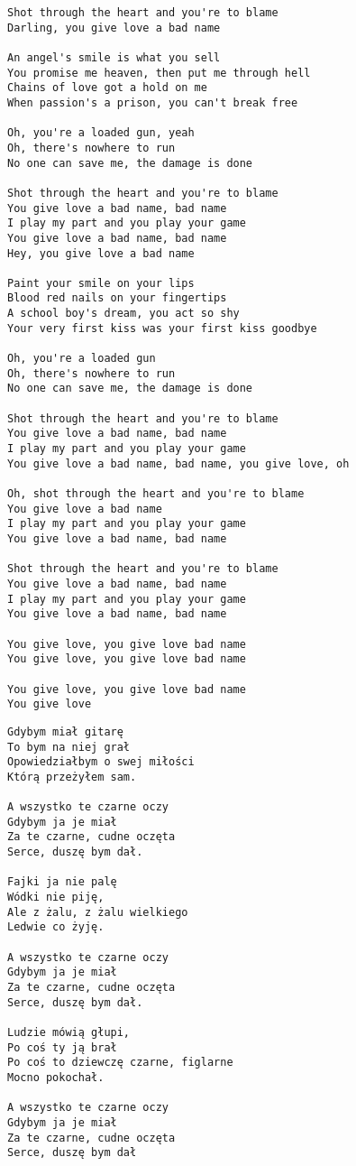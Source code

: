 \documentclass[12pt]{article}
\begin{document}
\begin{verbatim}
Shot through the heart and you're to blame
Darling, you give love a bad name

An angel's smile is what you sell
You promise me heaven, then put me through hell
Chains of love got a hold on me
When passion's a prison, you can't break free

Oh, you're a loaded gun, yeah
Oh, there's nowhere to run
No one can save me, the damage is done

Shot through the heart and you're to blame
You give love a bad name, bad name
I play my part and you play your game
You give love a bad name, bad name
Hey, you give love a bad name

Paint your smile on your lips
Blood red nails on your fingertips
A school boy's dream, you act so shy
Your very first kiss was your first kiss goodbye

Oh, you're a loaded gun
Oh, there's nowhere to run
No one can save me, the damage is done

Shot through the heart and you're to blame
You give love a bad name, bad name
I play my part and you play your game
You give love a bad name, bad name, you give love, oh

Oh, shot through the heart and you're to blame
You give love a bad name
I play my part and you play your game
You give love a bad name, bad name

Shot through the heart and you're to blame
You give love a bad name, bad name
I play my part and you play your game
You give love a bad name, bad name

You give love, you give love bad name
You give love, you give love bad name

You give love, you give love bad name
You give love
\end{verbatim}
\clearpage

\begin{verbatim}
Gdybym miał gitarę
To bym na niej grał
Opowiedziałbym o swej miłości
Którą przeżyłem sam.

A wszystko te czarne oczy
Gdybym ja je miał
Za te czarne, cudne oczęta
Serce, duszę bym dał.

Fajki ja nie palę
Wódki nie piję,
Ale z żalu, z żalu wielkiego
Ledwie co żyję.

A wszystko te czarne oczy
Gdybym ja je miał
Za te czarne, cudne oczęta
Serce, duszę bym dał.

Ludzie mówią głupi,
Po coś ty ją brał
Po coś to dziewczę czarne, figlarne
Mocno pokochał.

A wszystko te czarne oczy
Gdybym ja je miał
Za te czarne, cudne oczęta
Serce, duszę bym dał
\end{verbatim}
\clearpage
\end{document}

